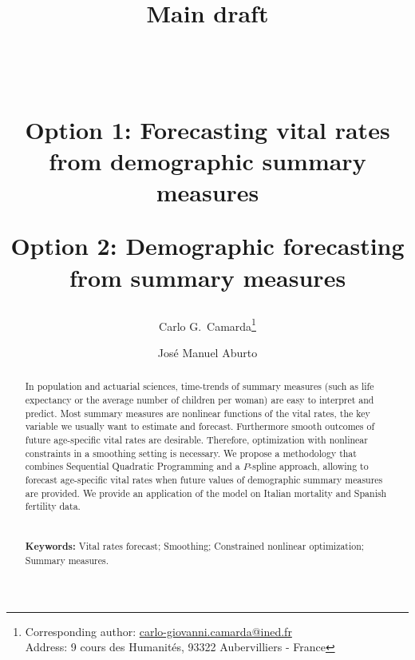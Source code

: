 \documentclass[12pt,a4paper,twoside]{article}
\begin{document}
	
\title{\normalsize{Main draft}\\
	$\,$\\	$\,$\\
	\begin{Huge}
		Option 1: Forecasting vital rates from demographic summary measures \linebreak
		
		Option 2: Demographic forecasting from summary measures 
	\end{Huge}}


	\author[1]{Carlo G.~Camarda\thanks{Corresponding author: \url{carlo-giovanni.camarda@ined.fr}\\
		\hspace*{1.8em}Address: 9 cours des Humanités, 93322 Aubervilliers - France}}
\author[2]{Jos\'e Manuel Aburto}


\date{}
\maketitle
\thispagestyle{empty}

\pagestyle{fancy}
\fancyhead[RO,LE]{\small}
\fancyfoot[L,R,C]{}
\rfoot{\thepage}

	
	
	\begin{abstract}
In population and actuarial sciences, time-trends of summary measures (such as life expectancy or the average number of children per woman) are easy to interpret and predict. Most summary measures are nonlinear functions of the vital rates, the key variable we usually want to estimate and forecast. Furthermore smooth outcomes of future age-specific vital rates are desirable. Therefore, optimization with nonlinear constraints in a smoothing setting is necessary. We propose a methodology that combines Sequential Quadratic Programming and a $P$-spline approach, allowing to forecast age-specific vital rates when future values of demographic summary measures are provided. We provide an application of the model on Italian mortality and Spanish fertility data.
\\
\\$\,$\\
{\bf Keywords:} Vital rates forecast; Smoothing; Constrained nonlinear optimization; Summary measures.
	\end{abstract}
	
\end{document}
